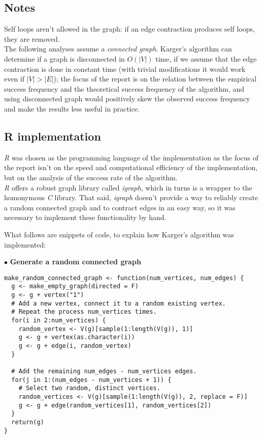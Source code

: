\documentclass[
12pt,
a4paper,
oneside,
headinclude,
footinclude]{article}
\begin{document}
\subsection{Notes}
\vspace{-5mm}
Self loops aren't allowed in the graph: if an edge contraction produces self loops, they are removed. \\
The following analyses assume a \textit{connected graph}. Karger's algorithm can determine if a graph is disconnected in $O(|V|)$ time,
if we assume that the edge contraction is done in constant time (with trivial modifications it would work even if $|V| > |E|$);
the focus of the report is on the relation between the empirical success frequency and the theoretical success frequency of the algorithm,
and using disconnected graph would positively skew the observed success frequency and make the results less useful in practice.

\subsection{R implementation}
\vspace{-5mm}
\textit{R} was chosen as the programming language of the implementation as the focus of the report isn't on the speed and computational efficiency of the implementation,
but on the analysis of the success rate of the algorithm. \\
\textit{R} offers a robust graph library called \textit{igraph}, which in turns is a wrapper to the homonymous \textit{C} library.
That said, \textit{igraph} doesn't provide a way to reliably create a random connected graph and to contract edges in an easy way,
so it was necessary to implement these functionality by hand.


What follows are snippets of code, to explain how Karger's algorithm was implemented:


$\bullet$ \textbf{Generate a random connected graph}

\begin{lstlisting}
make_random_connected_graph <- function(num_vertices, num_edges) {
  g <- make_empty_graph(directed = F)
  g <- g + vertex("1")
  # Add a new vertex, connect it to a random existing vertex.
  # Repeat the process num_vertices times.
  for(i in 2:num_vertices) {
    random_vertex <- V(g)[sample(1:length(V(g)), 1)]
    g <- g + vertex(as.character(i))
    g <- g + edge(i, random_vertex)
  }

  # Add the remaining num_edges - num_vertices edges.
  for(j in 1:(num_edges - num_vertices + 1)) {
    # Select two random, distinct vertices.
    random_vertices <- V(g)[sample(1:length(V(g)), 2, replace = F)]
    g <- g + edge(random_vertices[1], random_vertices[2])
  }
  return(g)
}
\end{lstlisting}
\end{document}

